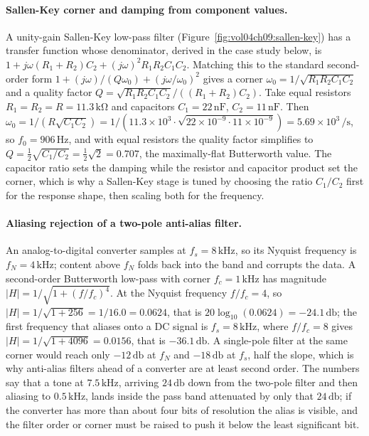 

\paragraph{Sallen-Key corner and damping from component values.}
A unity-gain Sallen-Key low-pass filter (Figure~\ref{fig:vol04ch09:sallen-key})
has a transfer function whose denominator, derived in the case study below,
is $1 + j\omega(R_1+R_2)C_2 + (j\omega)^2 R_1 R_2 C_1 C_2$. Matching this to
the standard second-order form $1 + (j\omega)/(Q\omega_0) + (j\omega/\omega_0)^2$
gives a corner $\omega_0 = 1/\sqrt{R_1 R_2 C_1 C_2}$ and a quality factor
$Q = \sqrt{R_1 R_2 C_1 C_2}/((R_1+R_2)C_2)$. Take equal resistors
$R_1 = R_2 = R = 11.3\,\si{\kilo\ohm}$ and capacitors $C_1 = 22\,\si{\nano
\farad}$, $C_2 = 11\,\si{\nano\farad}$. Then $\omega_0 = 1/(R\sqrt{C_1 C_2}) =
1/(11.3\times 10^{3}\cdot\sqrt{22\times 10^{-9}\cdot 11\times 10^{-9}}) =
5.69\times 10^{3}\,\si{\per\second}$, so $f_0 = 906\,\si{\hertz}$, and with
equal resistors the quality factor simplifies to $Q = \tfrac{1}{2}\sqrt{C_1/C_2}
= \tfrac{1}{2}\sqrt{2} = 0.707$, the maximally-flat Butterworth value. The
capacitor ratio sets the damping while the resistor and capacitor product set
the corner, which is why a Sallen-Key stage is tuned by choosing the ratio
$C_1/C_2$ first for the response shape, then scaling both for the frequency.

\paragraph{Aliasing rejection of a two-pole anti-alias filter.}
An analog-to-digital converter samples at $f_s = 8\,\si{\kilo\hertz}$, so its
Nyquist frequency is $f_N = 4\,\si{\kilo\hertz}$; content above $f_N$ folds
back into the band and corrupts the data. A second-order Butterworth low-pass
with corner $f_c = 1\,\si{\kilo\hertz}$ has magnitude $|H| = 1/\sqrt{1 +
(f/f_c)^4}$. At the Nyquist frequency $f/f_c = 4$, so $|H| = 1/\sqrt{1 + 256}
= 1/16.0 = 0.0624$, that is $20\log_{10}(0.0624) = -24.1\,\si{\decibel}$;
the first frequency that aliases onto a DC signal is $f_s = 8\,\si{\kilo
\hertz}$, where $f/f_c = 8$ gives $|H| = 1/\sqrt{1 + 4096} = 0.0156$, that is
$-36.1\,\si{\decibel}$. A single-pole filter at the same corner would reach
only $-12\,\si{\decibel}$ at $f_N$ and $-18\,\si{\decibel}$ at $f_s$,
half the slope, which is why anti-alias filters ahead of a converter are at
least second order. The numbers say that a tone at $7.5\,\si{\kilo\hertz}$,
arriving $24\,\si{\decibel}$ down from the two-pole filter and then aliasing
to $0.5\,\si{\kilo\hertz}$, lands inside the pass band attenuated by only that
$24\,\si{\decibel}$; if the converter has more than about four bits of
resolution the alias is visible, and the filter order or corner must be
raised to push it below the least significant bit.

